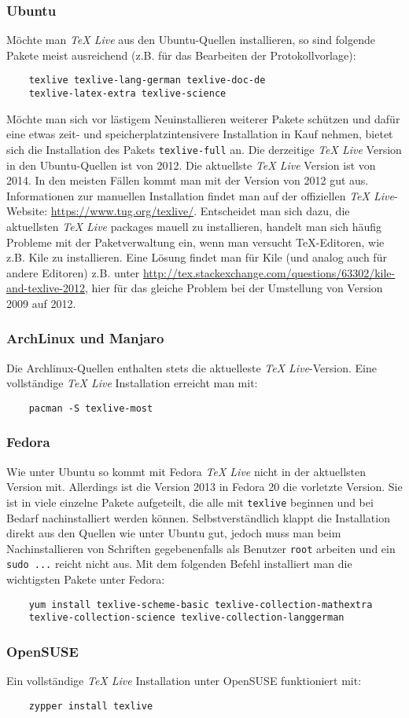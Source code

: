 \subsubsection{Ubuntu}
Möchte man \textit{TeX Live} aus den Ubuntu-Quellen installieren, so sind folgende Pakete meist ausreichend (z.B. für das Bearbeiten der Protokollvorlage):
\begin{verbatim}
	texlive texlive-lang-german texlive-doc-de
	texlive-latex-extra texlive-science
\end{verbatim}
Möchte man sich vor lästigem Neuinstallieren weiterer Pakete schützen und dafür eine etwas zeit- und speicherplatzintensivere Installation in Kauf nehmen, bietet sich die Installation des Pakets \verb|texlive-full| an. Die derzeitige \textit{TeX Live} Version in den Ubuntu-Quellen ist von 2012. Die aktuellste \textit{TeX Live} Version ist von 2014. In den meisten Fällen kommt man mit der Version von 2012 gut aus. Informationen zur manuellen Installation findet man auf der offiziellen \textit{TeX Live}-Website: \url{https://www.tug.org/texlive/}. Entscheidet man sich dazu, die aktuellsten \textit{TeX Live} packages mauell zu installieren, handelt man sich häufig Probleme mit der Paketverwaltung ein, wenn man versucht TeX-Editoren, wie z.B. Kile zu installieren. Eine Lösung findet man für Kile (und analog auch für andere Editoren) z.B. unter \url{http://tex.stackexchange.com/questions/63302/kile-and-texlive-2012}, hier für das gleiche Problem bei der Umstellung von Version 2009 auf 2012.

\subsubsection{ArchLinux und Manjaro}
Die Archlinux-Quellen enthalten stets die aktuelleste \textit{TeX Live}-Version. Eine vollständige \textit{TeX Live} Installation erreicht man mit:
\begin{verbatim}
	pacman -S texlive-most
\end{verbatim}

\subsubsection{Fedora}
Wie unter Ubuntu so kommt mit Fedora \textit{TeX Live} nicht in der aktuellsten Version mit.
Allerdings ist die Version 2013 in Fedora 20 die vorletzte Version.
Sie ist in viele einzelne Pakete aufgeteilt, die alle mit \verb|texlive| beginnen und bei Bedarf nachinstalliert werden können.
Selbstverständlich klappt die Installation direkt aus den Quellen wie unter Ubuntu gut, jedoch muss man beim Nachinstallieren von Schriften gegebenenfalls als Benutzer \verb|root| arbeiten und ein \verb|sudo ...| reicht nicht aus.
Mit dem folgenden Befehl installiert man die wichtigsten Pakete unter Fedora:
\begin{verbatim}
	yum install texlive-scheme-basic texlive-collection-mathextra
	texlive-collection-science texlive-collection-langgerman 
\end{verbatim}

\subsubsection{OpenSUSE}
Ein vollständige \textit{TeX Live} Installation unter OpenSUSE funktioniert mit:
\begin{verbatim}
	zypper install texlive
\end{verbatim}